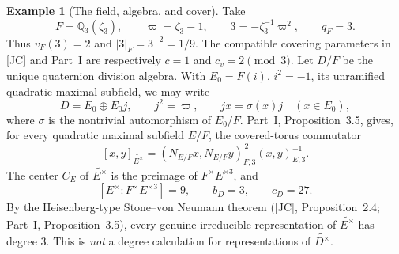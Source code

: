 \documentclass[11pt]{article}
\theoremstyle{plain}
\theoremstyle{definition}
\newtheorem{example}[theorem]{Example}
\begin{document}
\begin{example}[The field, algebra, and cover]\label{ex:ranktwo-data}
Take
\[
 F=\mathbb Q_3(\zeta_3),\qquad \varpi=\zeta_3-1,\qquad
 3=-\zeta_3^{-1}\varpi^2,\qquad q_F=3.
\]
Thus $v_F(3)=2$ and $|3|_F=3^{-2}=1/9$.  The compatible
covering parameters in [JC] and Part~I are respectively
$c=1$ and $c_v=2\pmod3$.  Let $D/F$ be the unique quaternion
division algebra.  With $E_0=F(i)$, $i^2=-1$, its unramified
quadratic maximal subfield, we may write
\[
 D=E_0\oplus E_0j,\qquad j^2=\varpi,\qquad
 jx=\sigma(x)j\quad(x\in E_0),
\]
where $\sigma$ is the nontrivial automorphism of $E_0/F$.
Part~I, Proposition~3.5, gives, for every quadratic maximal
subfield $E/F$, the covered-torus commutator
\begin{equation}\label{eq:ranktwo-comm}
 [x,y]_{\widetilde{E^\times}}=
 (N_{E/F}x,N_{E/F}y)_{F,3}^{\,2}
 (x,y)_{E,3}^{-1}.
\end{equation}
The center $C_E$ of $\widetilde{E^\times}$ is the preimage of
$F^\times E^{\times3}$, and
\[
 [E^\times:F^\times E^{\times3}]=9,
 \qquad b_D=3,\qquad c_D=27.
\]
By the Heisenberg-type Stone--von Neumann theorem
([JC], Proposition~2.4; Part~I, Proposition~3.5), every genuine
irreducible representation of $\widetilde{E^\times}$ has degree $3$.
This is \emph{not} a degree calculation for representations of
$\widetilde{D^\times}$.
\end{example}
\end{document}
